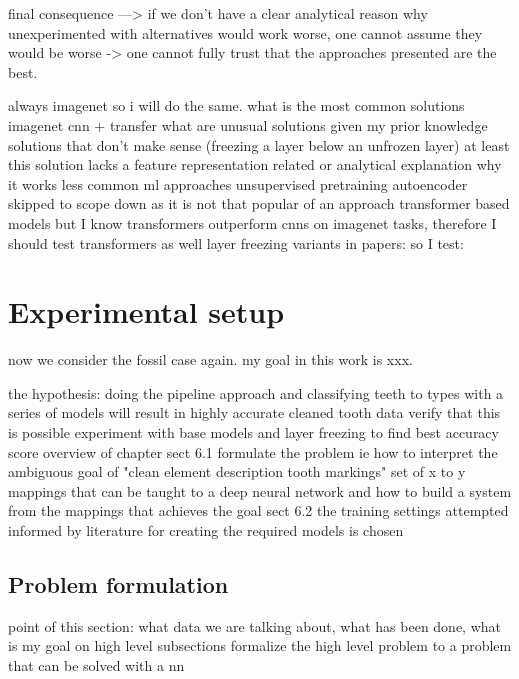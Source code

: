 \documentclass{article}
\begin{document}
final consequence
---> if we don't have a clear analytical reason why unexperimented with alternatives would work worse, one cannot assume they would be worse -> one cannot fully trust that the approaches presented are the best.




always imagenet so i will do the same.
what is the most common solutions
    imagenet cnn + transfer
what are unusual solutions given my prior knowledge
    solutions that don't make sense (freezing a layer below an unfrozen layer)
        at least this solution lacks a feature representation related or analytical explanation why it works
    less common ml approaches
        unsupervised pretraining
            autoencoder skipped to scope down as it is not that popular of an approach
        transformer based models
            but I know transformers outperform cnns on imagenet tasks, therefore I should test transformers as well
layer freezing 
    variants in papers:
    so I test:

\section{Experimental setup}

now we consider the fossil case again.
my goal in this work is xxx.

the hypothesis: doing the pipeline approach and classifying teeth to types with a series of models will result in highly accurate cleaned tooth data
    verify that this is possible
    experiment with base models and layer freezing to find best accuracy score
overview of chapter
    sect 6.1 formulate the problem ie how to interpret the ambiguous goal of 
    "clean element description tooth markings" set of x to y mappings that can be taught to a deep neural network
    and how to build a system from the mappings that achieves the goal
    sect 6.2 the training settings attempted informed by literature
    for creating the required models is chosen

\subsection{Problem formulation}

point of this section:
what data we are talking about, what has been done, what is my goal on high level 
subsections formalize the high level problem to a problem that can be solved with a nn
\end{document}
